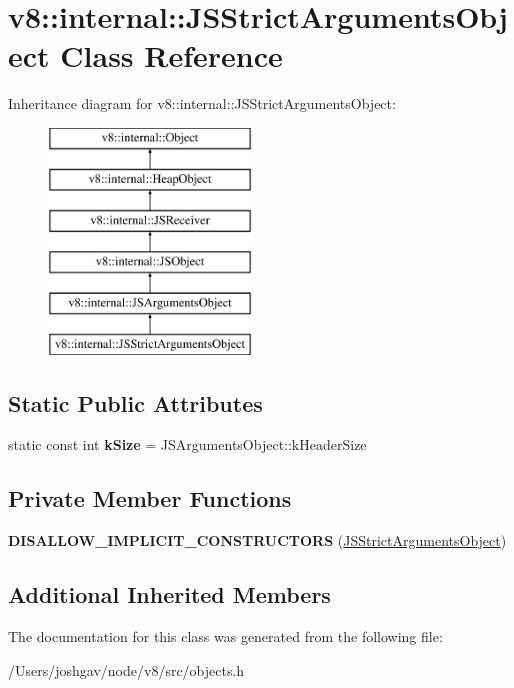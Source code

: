\hypertarget{classv8_1_1internal_1_1_j_s_strict_arguments_object}{}\section{v8\+:\+:internal\+:\+:J\+S\+Strict\+Arguments\+Object Class Reference}
\label{classv8_1_1internal_1_1_j_s_strict_arguments_object}
Inheritance diagram for v8\+:\+:internal\+:\+:J\+S\+Strict\+Arguments\+Object\+:\begin{figure}[H]
\begin{center}
\leavevmode
\includegraphics[height=6.000000cm]{classv8_1_1internal_1_1_j_s_strict_arguments_object}
\end{center}
\end{figure}
\subsection*{Static Public Attributes}
\begin{DoxyCompactItemize}
\item 
static const int {\bfseries k\+Size} = J\+S\+Arguments\+Object\+::k\+Header\+Size\hypertarget{classv8_1_1internal_1_1_j_s_strict_arguments_object_a484727970269d041b3d92b97f76d9061}{}\label{classv8_1_1internal_1_1_j_s_strict_arguments_object_a484727970269d041b3d92b97f76d9061}

\end{DoxyCompactItemize}
\subsection*{Private Member Functions}
\begin{DoxyCompactItemize}
\item 
{\bfseries D\+I\+S\+A\+L\+L\+O\+W\+\_\+\+I\+M\+P\+L\+I\+C\+I\+T\+\_\+\+C\+O\+N\+S\+T\+R\+U\+C\+T\+O\+RS} (\hyperlink{classv8_1_1internal_1_1_j_s_strict_arguments_object}{J\+S\+Strict\+Arguments\+Object})\hypertarget{classv8_1_1internal_1_1_j_s_strict_arguments_object_a4201b5d7e83ef152f71d435d8fcfd4dc}{}\label{classv8_1_1internal_1_1_j_s_strict_arguments_object_a4201b5d7e83ef152f71d435d8fcfd4dc}

\end{DoxyCompactItemize}
\subsection*{Additional Inherited Members}


The documentation for this class was generated from the following file\+:\begin{DoxyCompactItemize}
\item 
/\+Users/joshgav/node/v8/src/objects.\+h\end{DoxyCompactItemize}
